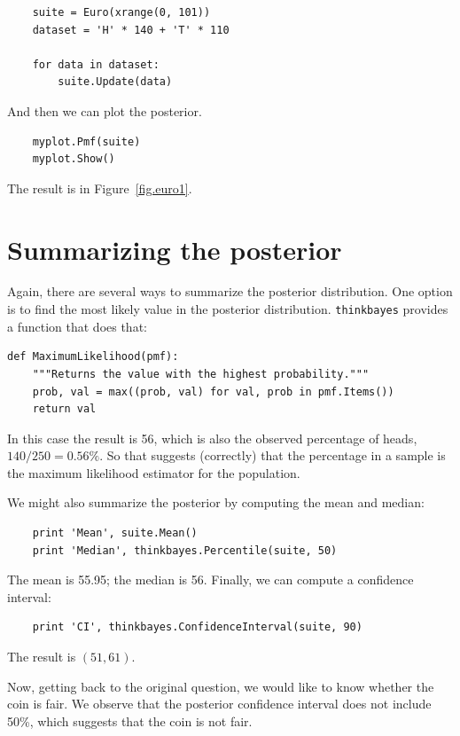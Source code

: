 \documentclass[12pt]{book}
\begin{document}
\begin{verbatim}
    suite = Euro(xrange(0, 101))
    dataset = 'H' * 140 + 'T' * 110

    for data in dataset:
        suite.Update(data)
\end{verbatim}

And then we can plot the posterior.

\begin{verbatim}
    myplot.Pmf(suite)
    myplot.Show()
\end{verbatim}

The result is in Figure~\ref{fig.euro1}.


\section{Summarizing the posterior}

Again, there are several ways to summarize the posterior distribution.
One option is to find the most likely value in the posterior
distribution.  \verb"thinkbayes" provides a function that does 
that:

\begin{verbatim}
def MaximumLikelihood(pmf):
    """Returns the value with the highest probability."""
    prob, val = max((prob, val) for val, prob in pmf.Items())
    return val
\end{verbatim}

In this case the result is 56, which is also the observed percentage of
heads, $140/250 = 0.56\%$.  So that suggests (correctly) that the
percentage in a sample is the maximum likelihood estimator
for the population.

We might also summarize the posterior by computing the mean
and median:

\begin{verbatim}
    print 'Mean', suite.Mean()
    print 'Median', thinkbayes.Percentile(suite, 50)
\end{verbatim}

The mean is 55.95; the median is 56.  Finally, we can compute a
confidence interval: 

\begin{verbatim}
    print 'CI', thinkbayes.ConfidenceInterval(suite, 90)
\end{verbatim}

The result is $(51, 61)$.

Now, getting back to the original question,
we would like to know whether the coin is fair.  We observe
that the posterior confidence interval does not include 50\%,
which suggests that the coin is not fair.
\end{document}

